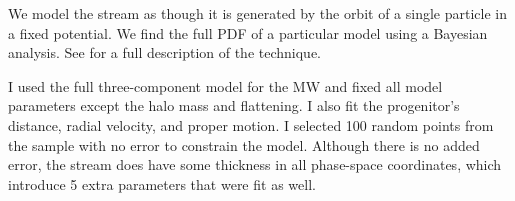 We model the stream as though it is generated by the orbit of a single particle in a fixed potential. We find the full PDF of a particular model using a Bayesian analysis. See \citet{Deg13} for a full description of the technique.

I used the full three-component model for the MW and fixed all model parameters except the halo mass and flattening. I also fit the progenitor's distance, radial velocity, and proper motion. I selected 100 random points from the sample with no error to constrain the model. Although there is no added error, the stream does have some thickness in all phase-space coordinates, which introduce 5 extra parameters that were fit as well.